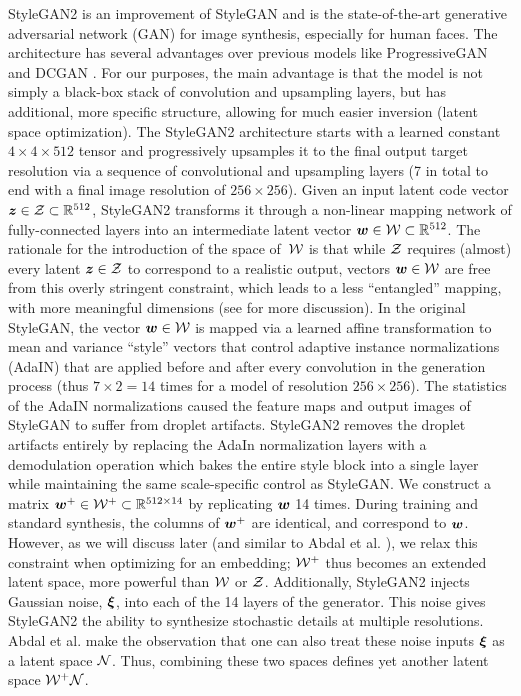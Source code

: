 StyleGAN2 \cite{karras2020analyzing} is an improvement of StyleGAN \cite{karras2019style} and is the state-of-the-art generative adversarial network (GAN) for image synthesis, especially for human faces.
The architecture has several advantages over previous models like ProgressiveGAN \cite{karras2018progressive} and DCGAN \cite{radford2015unsupervised}. For our purposes, the main advantage is that the model is not simply a black-box stack of convolution and upsampling layers, but has additional, more specific structure, allowing for much easier inversion (latent space optimization).
The StyleGAN2 architecture starts with a learned constant $4 \times 4 \times 512$ tensor and progressively upsamples it to the final output target resolution via a sequence of convolutional and upsampling layers (7 in total to end with a final image resolution of $256 \times 256$).
Given an input latent code vector $\bm{z} \in \mathcal{Z} \subset \mathbb{R}^{512}$, StyleGAN2 transforms it through a non-linear mapping network of fully-connected layers into an intermediate latent vector $\bm{w} \in \mathcal{W} \subset \mathbb{R}^{512}$.
The rationale for the introduction of the space of~$\mathcal{W}$ is that while $\mathcal{Z}$ requires (almost) every latent $\bm{z} \in \mathcal{Z}$ to correspond to a realistic output, vectors $\bm{w} \in \mathcal{W}$ are free from this overly stringent constraint, which leads to a less ``entangled'' mapping, with more meaningful dimensions (see \cite{karras2019style,karras2020analyzing} for more discussion).
In the original StyleGAN, the vector $\bm{w} \in \mathcal{W}$ is mapped via a learned affine transformation to mean and variance ``style'' vectors that control adaptive instance normalizations (AdaIN) \cite{huang2017arbitrary} that are applied before and after every convolution in the generation process (thus $7 \times 2 = 14$ times for a model of resolution $256 \times 256$). The statistics of the AdaIN normalizations caused the feature maps and output images of StyleGAN to suffer from droplet artifacts. StyleGAN2 removes the droplet artifacts entirely by replacing the AdaIn normalization layers with a demodulation operation which bakes the entire style block into a single layer while maintaining the same scale-specific control as StyleGAN.
We construct a matrix $\bm{w}^+ \in \mathcal{W}^+ \subset \mathbb{R}^{512 \times 14}$ by replicating $\bm{w}$ 14 times.
During training and standard synthesis, the columns of $\bm{w}^+$ are identical, and correspond to $\bm{w}$.
However, as we will discuss later (and similar to Abdal et al. \cite{abdal2019image2stylegan}), we relax this constraint when optimizing for an embedding; $\mathcal{W}^+$ thus becomes an extended latent space, more powerful than $\mathcal{W}$ or $\mathcal{Z}$.
Additionally, StyleGAN2 injects Gaussian noise, $\bm\xi$, into each of the 14 layers of the generator.
This noise gives StyleGAN2 the ability to synthesize stochastic details at multiple resolutions.
Abdal et al. \cite{abdal2020image2stylegan++} make the observation that one can also treat these noise inputs $\bm\xi$ as a latent space $\mathcal{N}$. Thus, combining these two spaces defines yet another latent space $\mathcal{W}^+\mathcal{N}$.


